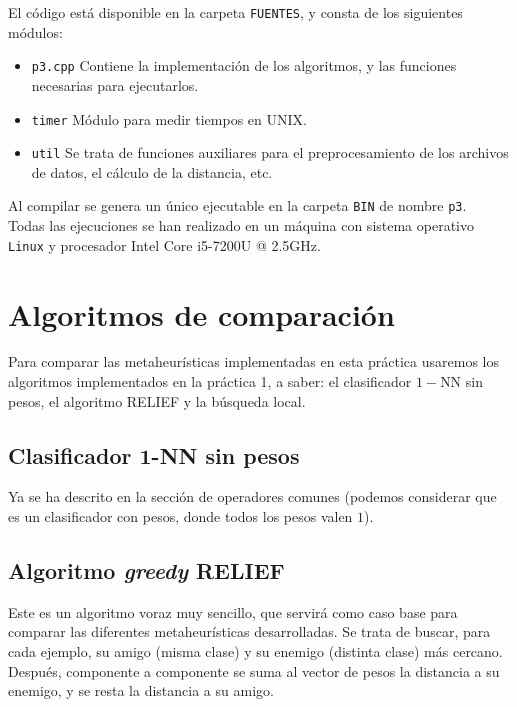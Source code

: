 \documentclass[12pt]{article}
\begin{document}
El código está disponible en la carpeta \verb|FUENTES|, y consta de los siguientes módulos:

\begin{itemize}
	\item \verb|p3.cpp| Contiene la implementación de los algoritmos, y las funciones necesarias para ejecutarlos.
	\item \verb|timer| Módulo para medir tiempos en UNIX.
	\item \verb|util| Se trata de funciones auxiliares para el preprocesamiento de los archivos de datos, el cálculo de la distancia, etc.
\end{itemize}

Al compilar se genera un único ejecutable en la carpeta \verb|BIN| de nombre \verb|p3|.\\

Todas las ejecuciones se han realizado en un máquina con sistema operativo \verb|Linux| y procesador Intel Core i5-7200U @ 2.5GHz.

\newpage
\section{Algoritmos de comparación}

Para comparar las metaheurísticas implementadas en esta práctica usaremos los algoritmos implementados en la práctica 1, a saber: el clasificador $1-$NN sin pesos, el algoritmo RELIEF y la búsqueda local.

\subsection*{{\color{red} Clasificador $\mathbf{1}$-NN sin pesos}}

Ya se ha descrito en la sección de operadores comunes (podemos considerar que es un clasificador con pesos, donde todos los pesos valen $1$).

\subsection*{{\color{red} Algoritmo \textit{greedy} RELIEF}}

Este es un algoritmo voraz muy sencillo, que servirá como caso base para comparar las diferentes metaheurísticas desarrolladas. Se trata de buscar, para cada ejemplo, su amigo (misma clase) y su enemigo (distinta clase) más cercano. Después, componente a componente se suma al vector de pesos la distancia a su enemigo, y se resta la distancia a su amigo.\\
\end{document}
